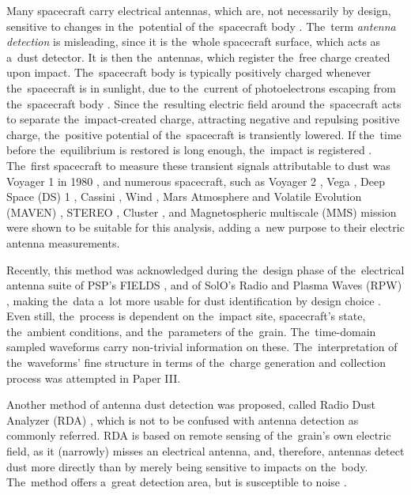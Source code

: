 Many spacecraft carry electrical antennas, which are, not necessarily by design, sensitive to changes in the~potential of the~spacecraft body \citep{meyer2017frequency}. The~term \textit{antenna detection} is misleading, since it is the~whole spacecraft surface, which acts as a~dust detector. It is then the~antennas, which register the~free charge created upon impact. The~spacecraft body is typically positively charged whenever the~spacecraft is in sunlight, due to the~current of photoelectrons escaping from the~spacecraft body \citep{guillemant2013simulation}. Since the~resulting electric field around the~spacecraft acts to separate the~impact-created charge, attracting negative and repulsing positive charge, the~positive potential of the~spacecraft is transiently lowered. If the~time before the~equilibrium is restored is long enough, the~impact is registered \citep{mann2019dust}. The~first spacecraft to measure these transient signals attributable to dust was Voyager 1 in 1980 \citep{scarf1982voyager,aubier1983shot,gurnett1997micron}, and numerous spacecraft, such as Voyager 2 \citep{gurnett1983micron}, Vega \citep{laakso1989impacts}, Deep Space ({DS}) 1 \citep{tsurutani2003dust}, Cassini \citep{kurth2006cassini}, Wind \citep{malaspina2014interplanetary}, Mars Atmosphere and Volatile Evolution ({MAVEN}) \citep{andersson2015dust}, STEREO \citep{zaslavsky2012interplanetary}, Cluster \citep{vaverka2017detection}, and Magnetospheric multiscale ({MMS}) mission \citep{vaverka2018comparison} were shown to be suitable for this analysis, adding a~new purpose to their electric antenna measurements. 

Recently, this method was acknowledged during the~design phase of the~electrical antenna suite of PSP's {FIELDS} \citep{bale2016fields}, and of SolO's Radio and Plasma Waves ({RPW}) \citep{maksimovic2020solar}, making the~data a~lot more usable for dust identification by design choice \citep{mann2019dust}. Even still, the~process is dependent on the~impact site, spacecraft's state, the~ambient conditions, and the~parameters of the~grain. The~time-domain sampled waveforms carry non-trivial information on these. The~interpretation of the~waveforms' fine structure in terms of the~charge generation and collection process was attempted in Paper III. 

Another method of antenna dust detection was proposed, called Radio Dust Analyzer ({RDA}) \citep{lesceux1989electric}, which is not to be confused with antenna detection as commonly referred. RDA is based on remote sensing of the~grain's own electric field, as it (narrowly) misses an electrical antenna, and, therefore, antennas detect dust more directly than by merely being sensitive to impacts on the~body. The~method offers a~great detection area, but is susceptible to noise \citep{meuris1996detection,meyer2001detecting}. 


